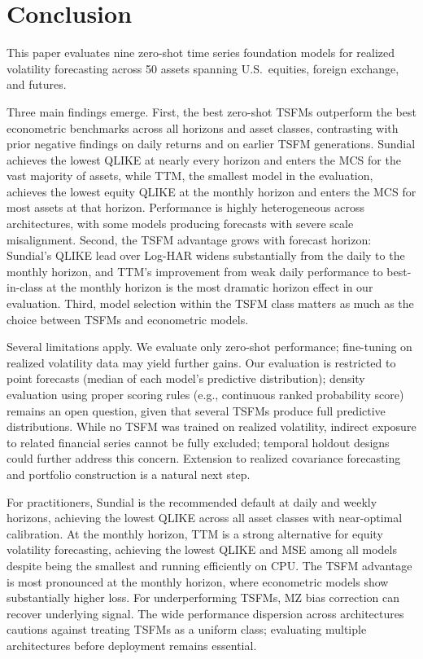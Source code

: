\documentclass[12pt]{article}
\begin{document}



\section{Conclusion}
\label{sec:conclusion}

This paper evaluates nine zero-shot time series foundation models for realized volatility forecasting across 50 assets spanning U.S.\ equities, foreign exchange, and futures.

Three main findings emerge. First, the best zero-shot TSFMs outperform the best econometric benchmarks across all horizons and asset classes, contrasting with prior negative findings on daily returns and on earlier TSFM generations. Sundial achieves the lowest QLIKE at nearly every horizon and enters the MCS for the vast majority of assets, while TTM, the smallest model in the evaluation, achieves the lowest equity QLIKE at the monthly horizon and enters the MCS for most assets at that horizon. Performance is highly heterogeneous across architectures, with some models producing forecasts with severe scale misalignment. Second, the TSFM advantage grows with forecast horizon: Sundial's QLIKE lead over Log-HAR widens substantially from the daily to the monthly horizon, and TTM's improvement from weak daily performance to best-in-class at the monthly horizon is the most dramatic horizon effect in our evaluation. Third, model selection within the TSFM class matters as much as the choice between TSFMs and econometric models.

Several limitations apply. We evaluate only zero-shot performance; fine-tuning on realized volatility data may yield further gains. Our evaluation is restricted to point forecasts (median of each model's predictive distribution); density evaluation using proper scoring rules (e.g., continuous ranked probability score) remains an open question, given that several TSFMs produce full predictive distributions. While no TSFM was trained on realized volatility, indirect exposure to related financial series cannot be fully excluded; temporal holdout designs could further address this concern. Extension to realized covariance forecasting and portfolio construction is a natural next step.

For practitioners, Sundial is the recommended default at daily and weekly horizons, achieving the lowest QLIKE across all asset classes with near-optimal calibration. At the monthly horizon, TTM is a strong alternative for equity volatility forecasting, achieving the lowest QLIKE and MSE among all models despite being the smallest and running efficiently on CPU. The TSFM advantage is most pronounced at the monthly horizon, where econometric models show substantially higher loss. For underperforming TSFMs, MZ bias correction can recover underlying signal. The wide performance dispersion across architectures cautions against treating TSFMs as a uniform class; evaluating multiple architectures before deployment remains essential.
\end{document}
